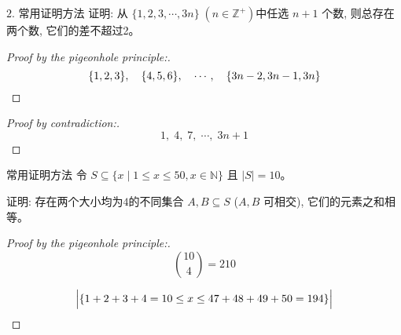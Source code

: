 \begin{frame}{}
  \begin{exampleblock}{$2.$ 常用证明方法}
    证明: 从 $\{1,2,3, \cdots, 3n\}\; (n \in \mathbb{Z}^{+})$中任选 $n+1$ 个数, 则总存在两个数, 它们的差不超过2。
  \end{exampleblock}

  \pause
  \begin{proof}[Proof by the pigeonhole principle:]
    \pause
    \[
      \{1,2,3\},\quad \{4,5,6\},\quad\cdots,\quad \{3n-2, 3n-1, 3n\}
    \]

  \end{proof}

  \pause
  \vspace{0.10cm}
  \begin{proof}[Proof by contradiction:]
    \pause
    \[
      1,\; 4,\; 7,\; \cdots,\; 3n + 1 
    \]
  \end{proof}
\end{frame}

\begin{frame}{}
  \begin{exampleblock}{常用证明方法}
    令 $S \subseteq \{x \mid 1 \le x \le 50, x \in \mathbb{N}\}$ 且 $|S| = 10$。
    
    证明: 存在两个大小均为$4$的不同集合 $A, B \subseteq S$ ($A, B$ 可相交),
    它们的元素之和相等。
  \end{exampleblock}

  \pause
  \begin{proof}[Proof by the pigeonhole principle:]
    \pause
    \[
      \binom{10}{4} = 210
    \]

    \centerline{}

    \[
      \Big\lvert \{1+2+3+4=10 \le x \le 47+48+49+50 = 194\} \Big\rvert
    \]
  \end{proof}
\end{frame}
